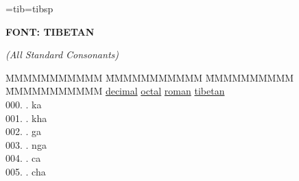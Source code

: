 \font\tibetan=tib\font\tibsp=tibsp 

\begin{flushleft}
{\large\bf FONT: TIBETAN}

{\it (All Standard Consonants)}
\end{flushleft}
\vspace{.1in}

\begin{tabbing}
MMMMMMMMMMM \=MMMMMMMMMMM \=MMMMMMMMMM \= MMMMMMMMMMM \kill
\underline{decimal}\> \underline{octal}\> \underline{roman}\> \underline{tibetan} \\
000.	. 	\> ka 	\> \bgroup\tibetan \def\u#1{\vtop{\baselineskip0pt\hbox{#1}\hbox{\tibsp\char123}}}\parindent=0pt \newbox\fillerbox\setbox\fillerbox\hbox{\vrule height0.4cm depth0.4cm width0pt}\def\filler{\copy\fillerbox}\filler\tibsp{}\tenrm\ \tibetan
\egroup  \\
001.	. 	\> kha 	\> \bgroup\tibetan \def\u#1{\vtop{\baselineskip0pt\hbox{#1}\hbox{\tibsp\char123}}}\parindent=0pt \newbox\fillerbox\setbox\fillerbox\hbox{\vrule height0.4cm depth0.4cm width0pt}\def\filler{\copy\fillerbox}\filler\tibsp{}\tenrm\ \tibetan
\egroup  \\
002.	. 	\> ga 	\> \bgroup\tibetan \def\u#1{\vtop{\baselineskip0pt\hbox{#1}\hbox{\tibsp\char123}}}\parindent=0pt \newbox\fillerbox\setbox\fillerbox\hbox{\vrule height0.4cm depth0.4cm width0pt}\def\filler{\copy\fillerbox}\filler\tibsp{}\tenrm\ \tibetan
\egroup  \\
003.	. 	\> nga 	\> \bgroup\tibetan \def\u#1{\vtop{\baselineskip0pt\hbox{#1}\hbox{\tibsp\char123}}}\parindent=0pt \newbox\fillerbox\setbox\fillerbox\hbox{\vrule height0.4cm depth0.4cm width0pt}\def\filler{\copy\fillerbox}\filler\tibsp{}\tenrm\ \tibetan
\egroup  \\
004.	. 	\> ca 	\> \bgroup\tibetan \def\u#1{\vtop{\baselineskip0pt\hbox{#1}\hbox{\tibsp\char123}}}\parindent=0pt \newbox\fillerbox\setbox\fillerbox\hbox{\vrule height0.4cm depth0.4cm width0pt}\def\filler{\copy\fillerbox}\filler\tibsp{}\tenrm\ \tibetan
\egroup  \\
005.	. 	\> cha 	\> \bgroup\tibetan \def\u#1{\vtop{\baselineskip0pt\hbox{#1}\hbox{\tibsp\char123}}}\parindent=0pt \newbox\fillerbox\setbox\fillerbox\hbox{\vrule height0.4cm depth0.4cm width0pt}\def\filler{\copy\fillerbox}\filler\tibsp{}\tenrm\ \tibetan

\end{tabbing}
